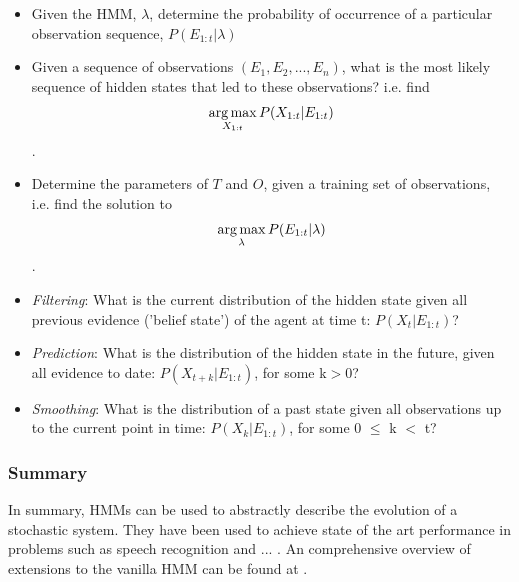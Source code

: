 \begin{itemize}
    \item Given the HMM, $\lambda$, determine the probability of occurrence of a particular observation sequence, $P(E_{1:t} | \lambda)$
    \item Given a sequence of observations $(E_1, E_2, ..., E_n)$, what is the most likely sequence of hidden states that led to these observations? i.e. find \[\operatorname*{arg\,max}_{X_{1:t}} P(X_{1:t} | E_{1:t})\].
    \item Determine the parameters of $T$ and $O$, given a training set of observations, i.e. find the solution to \[\operatorname*{arg\,max}_{\lambda} P(E_{1:t} | \lambda)\].
    \item \textit{Filtering}: What is the current distribution of the hidden state given all previous evidence ('belief state') of the agent at time t: $P(X_t | E_{1:t})$?
    \item \textit{Prediction}: What is the distribution of the hidden state in the future, given all evidence to date: $P(X_{t+k} | E_{1:t})$, for some k$>$0?
    \item \textit{Smoothing}: What is the distribution of a past state given all observations up to the current point in time: $P(X_k | E_{1:t})$, for some 0 $\leq$ k $<$ t?
\end{itemize}
\par


\subsubsection{Summary}
In summary, HMMs can be used to abstractly describe the evolution of a stochastic system. They have been used to achieve state of the art performance in problems such as speech recognition \cite{ChiuSTATE-OF-THE-ARTMODELS} and ... . An comprehensive overview of extensions to the vanilla HMM can be found at \cite{Murphy1994DynamicLearning}.